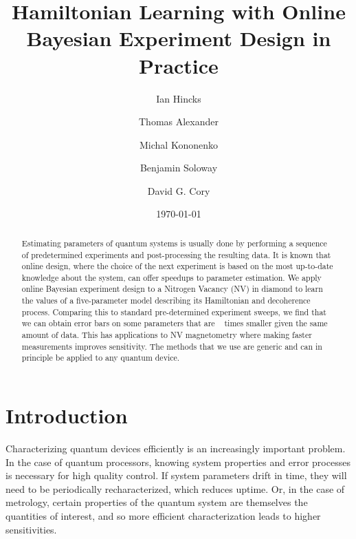 \documentclass[aps,nofootinbib,twocolumn,superscriptaddress]{revtex4}
\begin{document}
\title{Hamiltonian Learning with Online Bayesian Experiment Design in Practice}

\author{Ian Hincks}
\affilUWAMath
\affilIQC

\author{Thomas Alexander}
\affilUWPhys
\affilIQC

\author{Michal Kononenko}
\affilTODO

\author{Benjamin Soloway}
\affilTODO

\author{David G. Cory}
\affilUWChem
\affilIQC
\affilPI
\affilCIFAR


\date{\today}

\begin{abstract}
Estimating parameters of quantum systems is usually done by performing 
a sequence of predetermined experiments and post-processing the resulting data.
It is known that online design, where the 
choice of the next experiment is based on
the most up-to-date knowledge about the system, 
can offer speedups to parameter estimation.
We apply online Bayesian experiment design to a Nitrogen
Vacancy (NV) in diamond to learn the values of a 
five-parameter model describing its Hamiltonian and decoherence process.
Comparing this to standard pre-determined experiment sweeps, 
we find that we can obtain error bars on some parameters that 
are \TODO~ times smaller given the same amount of data.
This has applications to NV magnetometry where making faster measurements
improves sensitivity.
The methods that we use are generic and can in principle be 
applied to any quantum device.
\end{abstract}

\maketitle




\section{Introduction}
\label{sec:intro}

Characterizing quantum devices efficiently is an increasingly 
important problem.
In the case of quantum processors, knowing system properties
and error processes is necessary for high quality control.
If system parameters drift in time, they will 
need to be periodically recharacterized, which reduces uptime.
Or, in the case of metrology, certain properties of the quantum 
system are themselves the quantities of interest, and so more efficient 
characterization leads to higher sensitivities.
\end{document}
